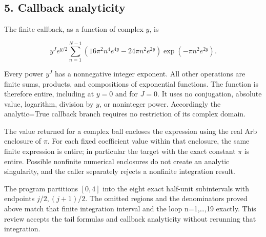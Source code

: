 \subsection{5. Callback analyticity}\label{C47stage:TT:callback-analyticity}

The finite callback, as a function of complex \(y\), is

\[
y^Je^{y/2}
\sum_{n=1}^{N-1}
\left(16\pi^2n^4e^{4y}-24\pi n^2e^{2y}\right)
\exp(-\pi n^2e^{2y}).
\tag{TT12}
\]

Every power \(y^J\) has a nonnegative integer exponent. All other operations are finite sums, products, and compositions of exponential functions. The function is therefore entire, including at \(y=0\) and for \(J=0\). It uses no conjugation, absolute value, logarithm, division by \(y\), or noninteger power. Accordingly the analytic=True callback branch requires no restriction of its complex domain.

The value returned for a complex ball encloses the expression using the real Arb enclosure of \(\pi\). For each fixed coefficient value within that enclosure, the same finite expression is entire; in particular the target with the exact constant \(\pi\) is entire. Possible nonfinite numerical enclosures do not create an analytic singularity, and the caller separately rejects a nonfinite integration result.

The program partitions \([0,4]\) into the eight exact half-unit subintervals with endpoints \(j/2,(j+1)/2\). The omitted regions and the denominators proved above match that finite integration interval and the loop n=1,\ldots,19 exactly. This review accepts the tail formulas and callback analyticity without rerunning that integration.
